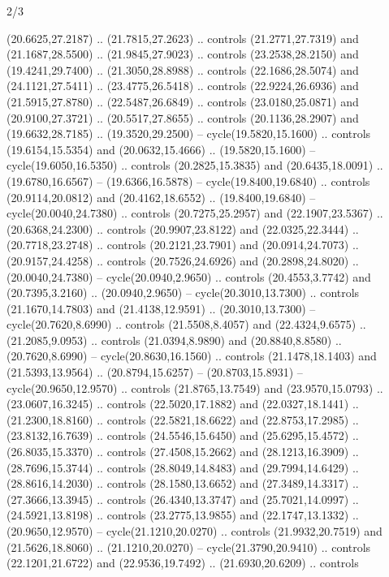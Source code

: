 \begin{flagdescription}{2/3}
\begin{scope}[yshift=\flagwidth,scale=\flagwidth/1241.93737]
\begin{scope}[y=-1mm, x=1mm,draw=gold,fill=blue,line join=miter,miter limit=4,line width=1.8\lw]
\begin{scope}[y=1mm, x=1mm, yscale=-1,shift={(573.68mm+\str,145.75)}]
\begin{scope}[scale=1.35,shift={(-9,-3)}]
\begin{scope}[scale=0.55]
\begin{scope}[scale=1.333]
    (20.6625,27.2187) .. (21.7815,27.2623) .. controls (21.2771,27.7319) and
    (21.1687,28.5500) .. (21.9845,27.9023) .. controls (23.2538,28.2150) and
    (19.4241,29.7400) .. (21.3050,28.8988) .. controls (22.1686,28.5074) and
    (24.1121,27.5411) .. (23.4775,26.5418) .. controls (22.9224,26.6936) and
    (21.5915,27.8780) .. (22.5487,26.6849) .. controls (23.0180,25.0871) and
    (20.9100,27.3721) .. (20.5517,27.8655) .. controls (20.1136,28.2907) and
    (19.6632,28.7185) .. (19.3520,29.2500) -- cycle(19.5820,15.1600) .. controls
    (19.6154,15.5354) and (20.0632,15.4666) .. (19.5820,15.1600) --
    cycle(19.6050,16.5350) .. controls (20.2825,15.3835) and (20.6435,18.0091) ..
    (19.6780,16.6567) -- (19.6366,16.5878) -- cycle(19.8400,19.6840) .. controls
    (20.9114,20.0812) and (20.4162,18.6552) .. (19.8400,19.6840) --
    cycle(20.0040,24.7380) .. controls (20.7275,25.2957) and (22.1907,23.5367) ..
    (20.6368,24.2300) .. controls (20.9907,23.8122) and (22.0325,22.3444) ..
    (20.7718,23.2748) .. controls (20.2121,23.7901) and (20.0914,24.7073) ..
    (20.9157,24.4258) .. controls (20.7526,24.6926) and (20.2898,24.8020) ..
    (20.0040,24.7380) -- cycle(20.0940,2.9650) .. controls (20.4553,3.7742) and
    (20.7395,3.2160) .. (20.0940,2.9650) -- cycle(20.3010,13.7300) .. controls
    (21.1670,14.7803) and (21.4138,12.9591) .. (20.3010,13.7300) --
    cycle(20.7620,8.6990) .. controls (21.5508,8.4057) and (22.4324,9.6575) ..
    (21.2085,9.0953) .. controls (21.0394,8.9890) and (20.8840,8.8580) ..
    (20.7620,8.6990) -- cycle(20.8630,16.1560) .. controls (21.1478,18.1403) and
    (21.5393,13.9564) .. (20.8794,15.6257) -- (20.8703,15.8931) --
    cycle(20.9650,12.9570) .. controls (21.8765,13.7549) and (23.9570,15.0793) ..
    (23.0607,16.3245) .. controls (22.5020,17.1882) and (22.0327,18.1441) ..
    (21.2300,18.8160) .. controls (22.5821,18.6622) and (22.8753,17.2985) ..
    (23.8132,16.7639) .. controls (24.5546,15.6450) and (25.6295,15.4572) ..
    (26.8035,15.3370) .. controls (27.4508,15.2662) and (28.1213,16.3909) ..
    (28.7696,15.3744) .. controls (28.8049,14.8483) and (29.7994,14.6429) ..
    (28.8616,14.2030) .. controls (28.1580,13.6652) and (27.3489,14.3317) ..
    (27.3666,13.3945) .. controls (26.4340,13.3747) and (25.7021,14.0997) ..
    (24.5921,13.8198) .. controls (23.2775,13.9855) and (22.1747,13.1332) ..
    (20.9650,12.9570) -- cycle(21.1210,20.0270) .. controls (21.9932,20.7519) and
    (21.5626,18.8060) .. (21.1210,20.0270) -- cycle(21.3790,20.9410) .. controls
    (22.1201,21.6722) and (22.9536,19.7492) .. (21.6930,20.6209) .. controls

\end{scope}
\end{scope}
\end{scope}
\end{scope}
\end{scope}
\end{scope}
\end{flagdescription}

